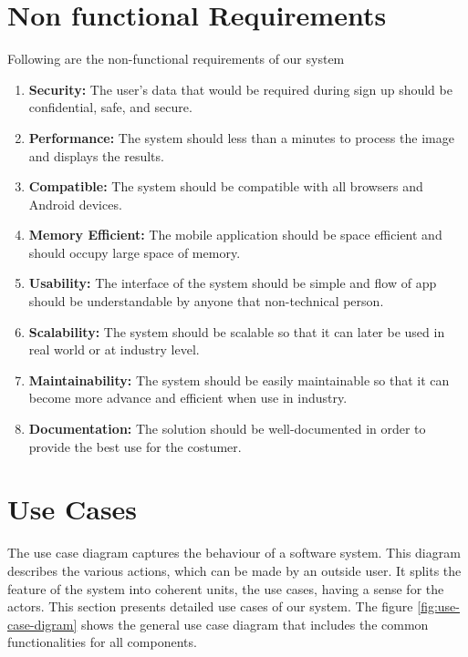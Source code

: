 \section{Non functional Requirements}
Following are the non-functional requirements of our system
\begin{enumerate}
  \item \textbf{Security:} The user's data that would be required during sign up should be confidential, safe, and secure.
  \item \textbf{Performance:} The system should less than a minutes to process the image and displays the results.
  \item \textbf{Compatible:} The system should be compatible with all browsers and Android devices.
  \item \textbf{Memory Efficient:} The mobile application should be space efficient and should occupy large space of memory.
  \item \textbf{Usability:} The interface of the system should be simple and flow of app should be understandable by anyone that non-technical person.
  \item \textbf{Scalability:} The system should be scalable so that it can later be used in real world or at industry level.
  \item \textbf{Maintainability:} The system should be easily maintainable so that it can become more advance and efficient when use in industry.
  \item \textbf{Documentation:} The solution should be well-documented in order to provide the best use for the costumer.
\end{enumerate}

\pagebreak

\section{Use Cases}
The use case diagram captures the behaviour of a software system. This diagram describes the various actions, which can be made by an outside user. It splits the feature of the system into coherent units, the use cases, having a sense for the actors. This section presents detailed use cases of our system. The figure \ref{fig:use-case-digram} shows the general use case diagram that includes the common functionalities for all components. \\


